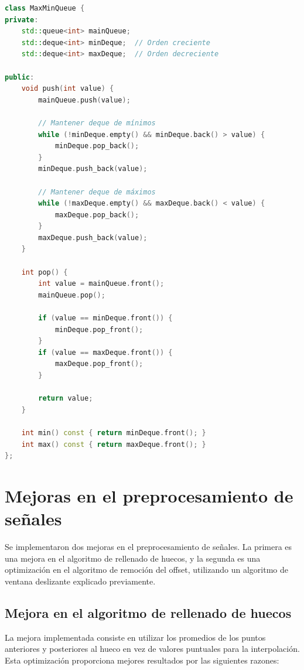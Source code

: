 \documentclass[12pt,a4paper]{article}
\begin{document}
\begin{lstlisting}[language=C++, label=lst:maxminqueue_simple, caption={MaxMinQueue.hpp - Implementación completa de MaxMinQueue con dos deques auxiliares}]
class MaxMinQueue {
private:
    std::queue<int> mainQueue;
    std::deque<int> minDeque;  // Orden creciente
    std::deque<int> maxDeque;  // Orden decreciente

public:
    void push(int value) {
        mainQueue.push(value);
        
        // Mantener deque de mínimos
        while (!minDeque.empty() && minDeque.back() > value) {
            minDeque.pop_back();
        }
        minDeque.push_back(value);
        
        // Mantener deque de máximos
        while (!maxDeque.empty() && maxDeque.back() < value) {
            maxDeque.pop_back();
        }
        maxDeque.push_back(value);
    }
    
    int pop() {
        int value = mainQueue.front();
        mainQueue.pop();
        
        if (value == minDeque.front()) {
            minDeque.pop_front();
        }
        if (value == maxDeque.front()) {
            maxDeque.pop_front();
        }
        
        return value;
    }
    
    int min() const { return minDeque.front(); }
    int max() const { return maxDeque.front(); }
};
\end{lstlisting}

\section{Mejoras en el preprocesamiento de señales}

Se implementaron dos mejoras en el preprocesamiento de señales. La primera es una mejora en el algoritmo de rellenado de huecos, y la segunda es una optimización en el algoritmo de remoción del offset, utilizando un algoritmo de ventana deslizante explicado previamente.

\subsection{Mejora en el algoritmo de rellenado de huecos}

La mejora implementada consiste en utilizar los promedios de los puntos anteriores y posteriores al hueco en vez de valores puntuales para la interpolación. Esta optimización proporciona mejores resultados por las siguientes razones:
\end{document}
